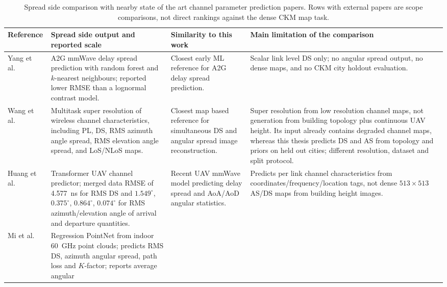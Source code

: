 \begin{table}[!htbp]
\centering
\caption[Spread side comparison with nearby state of the art.]%
{Spread side comparison with nearby state of the art channel parameter
prediction papers. Rows with external papers are scope comparisons, not direct
rankings against the dense CKM map task.}
\label{tab:spread_soa_context}
\begingroup
\scriptsize
\setlength{\tabcolsep}{3pt}
\renewcommand{\arraystretch}{0.98}
\begin{tabularx}{\textwidth}{>{\raggedright\arraybackslash}p{}
>{\raggedright\arraybackslash}p{}
>{\raggedright\arraybackslash}p{}
>{\raggedright\arraybackslash}X}
\toprule
Reference & Spread side output and reported scale & Similarity to this work & Main limitation of the comparison \\
\midrule
Yang et al.\ \cite{yang2019a2gml} &
A2G mmWave delay spread prediction with random forest and \(k\)-nearest
neighbours; reported lower RMSE than a lognormal contrast model. &
Closest early ML reference for A2G delay spread prediction. &
Scalar link level DS only; no angular spread output, no dense maps, and no CKM
city holdout evaluation. \\
Wang et al.\ \cite{wang2023multitasksr} &
Multitask super resolution of wireless channel characteristics, including PL,
DS, RMS azimuth angle spread, RMS elevation angle spread, and LoS/NLoS maps. &
Closest map based reference for simultaneous DS and angular spread image
reconstruction. &
Super resolution from low resolution channel maps, not generation from building
topology plus continuous UAV height. Its input already contains degraded
channel maps, whereas this thesis predicts DS and AS from topology and priors
on held out cities; different resolution, dataset and split protocol. \\
Huang et al.\ \cite{huang2025a2gtransformer} &
Transformer UAV channel predictor; merged data RMSE of \SI{4.577}{ns} for RMS
DS and \(1.549^\circ\), \(0.375^\circ\), \(0.864^\circ\), \(0.074^\circ\) for
RMS azimuth/elevation angle of arrival and departure quantities. &
Recent UAV mmWave model predicting delay spread and AoA/AoD angular
statistics. &
Predicts per link channel characteristics from coordinates/frequency/location
tags, not dense \(513\times513\) AS/DS maps from building height images. \\
Mi et al.\ \cite{mi2024pointcloud} &
Regression PointNet from indoor \SI{60}{GHz} point clouds; predicts RMS DS,
azimuth angular spread, path loss and \(K\)-factor; reports average angular

\end{tabularx}
\end{table}
